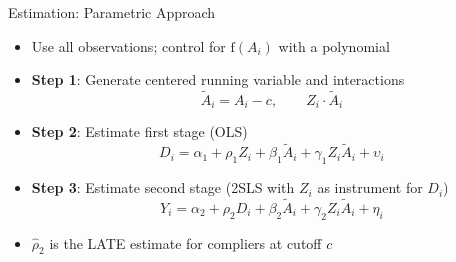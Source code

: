 \documentclass[hyperref={pdfpagelabels=false}]{beamer}
\begin{document}
\begin{frame}{Estimation: Parametric Approach}{}
	\begin{itemize}
		\item Use all observations; control for $\mathrm{f}(A_i)$ with a polynomial
		\vspace{0.2cm}
		\item \textbf{Step 1}: Generate centered running variable and interactions
		\begin{equation*}
			\tilde{A}_i = A_i - c, \qquad Z_i \cdot \tilde{A}_i
		\end{equation*}
		\vspace{0.2cm}
		\item \textbf{Step 2}: Estimate first stage (OLS)
		\begin{equation*}
			D_i = \alpha_1 + \rho_1 Z_i + \beta_1 \tilde{A}_i + \gamma_1 Z_i \tilde{A}_i + \upsilon_i
		\end{equation*}
		\vspace{0.2cm}
		\item \textbf{Step 3}: Estimate second stage (2SLS with $Z_i$ as instrument for $D_i$)
		\begin{equation*}
			Y_i = \alpha_2 + \rho_2 D_i + \beta_2 \tilde{A}_i + \gamma_2 Z_i \tilde{A}_i + \eta_i
		\end{equation*}
		\vspace{0.2cm}
		\item $\hat{\rho}_2$ is the LATE estimate for compliers at cutoff $c$
	\end{itemize}
\end{frame}
\end{document}
